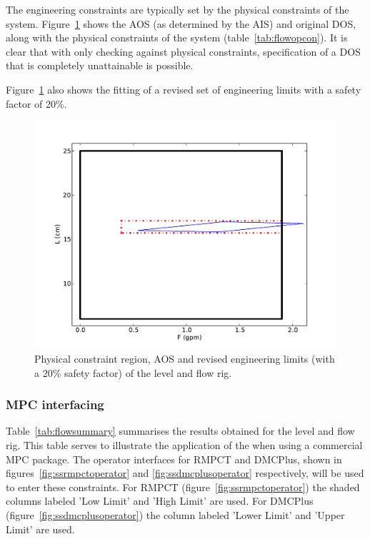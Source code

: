 The engineering constraints are typically set by the physical constraints of the system.
Figure~\ref{fig:flowcontypes} shows the AOS (as determined by the AIS) and original DOS, along with the physical constraints of the system (table~\ref{tab:flowopcon}).
It is clear that with only checking against physical constraints, specification of a DOS that is completely unattainable is possible.

Figure~\ref{fig:flowcontypes} also shows the fitting of a revised set of engineering limits with a safety factor of 20\%.

\begin{figure}[htbp]
  \centering
    \includegraphics[width=\fullwidth]{graph/flowcontypes.pdf}
  \caption[Physical constraint region of level and flow rig]{Physical constraint region, AOS and revised engineering limits (with a 20\% safety factor) of the level and flow rig.}
  \label{fig:flowcontypes}
\end{figure}

\subsubsection{MPC interfacing}
Table~\ref{tab:flowsummary} summarises the results obtained for the level and flow rig.
This table serves to illustrate the application of the when using a commercial MPC package.
The operator interfaces for RMPCT and DMCPlus, shown in figures~\ref{fig:ssrmpctoperator} and \ref{fig:ssdmcplusoperator} respectively, will be used to enter these constraints.
For RMPCT (figure~\ref{fig:ssrmpctoperator}) the shaded columns labeled 'Low Limit' and 'High Limit' are used.
For DMCPlus (figure~\ref{fig:ssdmcplusoperator}) the column labeled 'Lower Limit' and 'Upper Limit' are used.

